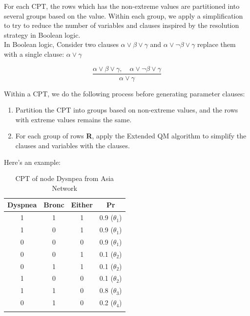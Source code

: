         \noindent For each CPT, the rows which has the non-extreme values are partitioned into several groups based on the value. Within each group, we apply a simplification to try to reduce the number of variables and clauses inspired by the resolution strategy in Boolean logic.\\
        
        \noindent In Boolean logic, Consider two clauses $\alpha \vee \beta \vee \gamma$  and $\alpha \vee \neg\beta \vee \gamma$
        replace them with a single clause: $\alpha \vee \gamma$
        
        $$\frac{ \alpha \vee \beta \vee \gamma, \quad \alpha \vee \neg\beta \vee \gamma}{\alpha \vee \gamma}$$
        
        Within a CPT, we do the following process before generating parameter clauses:\\
        \begin{enumerate}
            \item Partition the CPT into groups based on non-extreme values, and the rows with extreme values remains the same.
            \item For each group of rows \textbf{R}, apply the Extended QM algorithm to simplify the clauses and variables with the clauses.\\
        \end{enumerate}
        
        
        Here's an example:\\
        \begin{table}[ht]
        \centering
        \begin{tabular}{c c c c}
            \hline
            Dyspnea & Bronc & Either & Pr\\
            \hline
            \hline
            1 & 1 & 1 & 0.9 ($\theta_{1}$) \\
            1 & 0 & 1 & 0.9 ($\theta_{1}$)\\
            0 & 0 & 0 & 0.9 ($\theta_{1}$)\\
            0 & 0 & 1 & 0.1 ($\theta_{2}$)\\
            0 & 1 & 1 & 0.1 ($\theta_{2}$)\\
            1 & 0 & 0 & 0.1 ($\theta_{2}$)\\
            1 & 1 & 0 & 0.8 ($\theta_{3}$)\\
            0 & 1 & 0 & 0.2 ($\theta_{4}$)\\
            \hline
        \label{ta:cpt_Dysp}
        \end{tabular}
        \caption{CPT of node Dysnpea from Asia Network}
        \end{table}
        
